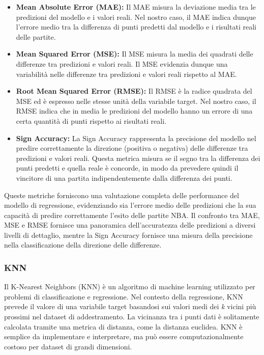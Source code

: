 \begin{itemize}
    \item \textbf{Mean Absolute Error (MAE):} Il MAE misura la deviazione media tra le predizioni del modello e i valori reali. Nel nostro caso, il MAE indica dunque l'errore medio tra la differenza di punti predetti dal modello e i risultati reali delle partite.

    \item \textbf{Mean Squared Error (MSE):} Il MSE misura la media dei quadrati delle differenze tra predizioni e valori reali. Il MSE evidenzia dunque una variabilità nelle differenze tra predizioni e valori reali rispetto al MAE.

    \item \textbf{Root Mean Squared Error (RMSE):} Il RMSE è la radice quadrata del MSE ed è espresso nelle stesse unità della variabile target. Nel nostro caso, il RMSE indica che in media le predizioni del modello hanno un errore di una certa quantità di punti rispetto ai risultati reali.

    \item \textbf{Sign Accuracy:} La Sign Accuracy rappresenta la precisione del modello nel predire correttamente la direzione (positiva o negativa) delle differenze tra predizioni e valori reali. Questa metrica misura se il segno tra la differenza dei punti predetti e quella reale è concorde, in modo da prevedere quindi il vincitore di una partita indipendentemente dalla differenza dei punti.
\end{itemize}

Queste metriche forniscono una valutazione completa delle performance del modello di regressione, evidenziando sia l'errore medio delle predizioni che la sua capacità di predire correttamente l'esito delle partite NBA. Il confronto tra MAE, MSE e RMSE fornisce una panoramica dell'accuratezza delle predizioni a diversi livelli di dettaglio, mentre la Sign Accuracy fornisce una misura della precisione nella classificazione della direzione delle differenze.

\subsubsection{KNN}

Il K-Nearest Neighbors (KNN) è un algoritmo di machine learning utilizzato per problemi di classificazione e regressione. Nel contesto della regressione, KNN prevede il valore di una variabile target basandosi sui valori medi dei \textit{k} vicini più prossimi nel dataset di addestramento. La vicinanza tra i punti dati è solitamente calcolata tramite una metrica di distanza, come la distanza euclidea. KNN è semplice da implementare e interpretare, ma può essere computazionalmente costoso per dataset di grandi dimensioni.


